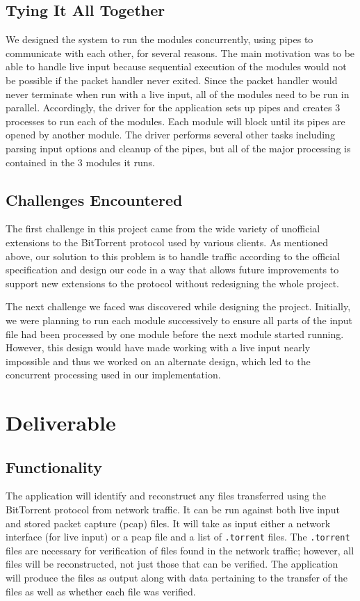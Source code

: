 \documentclass{acm_proc_article-sp}
\begin{document}
\subsection{Tying It All Together}
We designed the system to run the modules concurrently, using pipes to
communicate with each other, for several reasons. The main motivation was to be
able to handle live input because sequential execution of the modules would not
be possible if the packet handler never exited. Since the packet handler would
never terminate when run with a live input, all of the modules need to be run in
parallel. Accordingly, the driver for the application sets up pipes and creates
3 processes to run each of the modules. Each module will block until its pipes
are opened by another module. The driver performs several other tasks including
parsing input options and cleanup of the pipes, but all of the major processing
is contained in the 3 modules it runs.

\subsection{Challenges Encountered}
The first challenge in this project came from the wide variety of unofficial
extensions to the  BitTorrent protocol used by various clients. As mentioned
above, our solution to this problem is to handle traffic according to the
official specification and design our code in a way that allows future
improvements to support new extensions to the protocol without redesigning the
whole project.

The next challenge we faced was discovered while designing the project.
Initially, we were planning to run each module successively to ensure all parts
of the input file had been processed by one module before the next module
started running. However, this design would have made working with a live input
nearly impossible and thus we worked on an alternate design, which led to the
concurrent processing used in our implementation.

\section{Deliverable}
\subsection{Functionality}
The application will identify and reconstruct any files transferred using the
BitTorrent protocol from network traffic. It can be run against both live input
and stored packet capture (pcap) files. It will take as input either a network
interface (for live input) or a pcap file and a list of \texttt{.torrent}
files. The \texttt{.torrent} files are necessary for verification of files found
in the network traffic; however, all files will be reconstructed, not just those
that can be verified. The application will produce the files as output along
with data pertaining to the transfer of the files as well as whether each file
was verified.
\end{document}
